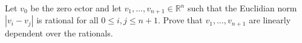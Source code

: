 Let \(v_{0}\) be the zero ector and let \(v_{1},\dots,v_{n+1}\in\mathbb{R}^{n}\) such that the Euclidian norm \(|v_{i}-v_{j}|\) is rational for all \(0\le i,j\le n+1\). Prove that \(v_{1},\dots,v_{n+1}\) are linearly dependent over the rationals.